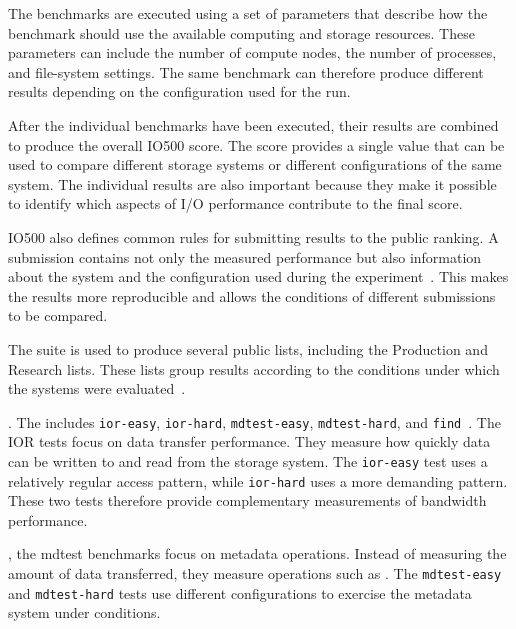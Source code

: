 The benchmarks are executed using a set of parameters that describe how
the benchmark should use the available computing and storage resources.
These parameters can include the number of compute nodes, the number of
processes, and file-system settings. The same benchmark can therefore
produce different results depending on the configuration used for the
run.

After the individual benchmarks have been executed, their results are
combined to produce the overall IO500 score. The score provides a single
value that can be used to compare different storage systems or different
configurations of the same system. The individual results are also
important because they make it possible to identify which aspects of I/O
performance contribute to the final score.

IO500 also defines common rules for submitting results to the public
ranking. A submission contains not only the measured performance but also
information about the system and the configuration used during the
experiment~\cite{io500rules}. This makes the results more reproducible
and allows the conditions of different submissions to be compared.

The suite is used to produce several public lists, including the
Production and Research lists. These lists group results according to
the conditions under which the systems were evaluated~\cite{io500list}.


. The  includes
\texttt{ior-easy}, \texttt{ior-hard}, \texttt{mdtest-easy},
\texttt{mdtest-hard}, and \texttt{find}~\cite{io500about,io500rules}.
 The IOR tests focus on data transfer performance. They measure how
quickly data can be written to and read from the storage system. The
\texttt{ior-easy} test uses a relatively regular access pattern, while
\texttt{ior-hard} uses a more demanding pattern. These two tests
therefore provide complementary measurements of bandwidth performance.

, the mdtest benchmarks focus on metadata operations.
Instead of measuring the amount of data transferred, they measure
operations such as . The
\texttt{mdtest-easy} and \texttt{mdtest-hard} tests use different
configurations to exercise the metadata system under
 conditions.

